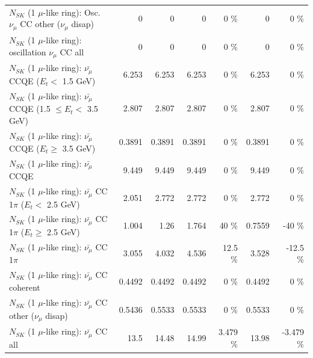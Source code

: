 \begin{table}
\begin{tabular}{| l | r | r | r  r | r  r |}
         $N_{SK}$ (1 $\mu$-like ring): Osc. $\nu_\mu$ CC other ($\nu_\mu$ disap) &               0 &               0 &               0 &        0 \%  &               0 &        0 \%  \\ 
                      $N_{SK}$ (1 $\mu$-like ring): oscillation $\nu_\mu$ CC all &               0 &               0 &               0 &        0 \%  &               0 &        0 \%  \\ 
\hline
\hline
          $N_{SK}$ (1 $\mu$-like ring): $\bar{\nu_\mu}$ CCQE ($E_{t} <$ 1.5 GeV) &           6.253 &           6.253 &           6.253 &        0 \%  &           6.253 &        0 \%  \\ 
 $N_{SK}$ (1 $\mu$-like ring): $\bar{\nu_\mu}$ CCQE (1.5 $\leq E_{t} <$ 3.5 GeV) &           2.807 &           2.807 &           2.807 &        0 \%  &           2.807 &        0 \%  \\ 
       $N_{SK}$ (1 $\mu$-like ring): $\bar{\nu_\mu}$ CCQE ($E_{t} \geq$ 3.5 GeV) &          0.3891 &          0.3891 &          0.3891 &        0 \%  &          0.3891 &        0 \%  \\ 
\hline
                              $N_{SK}$ (1 $\mu$-like ring): $\bar{\nu_\mu}$ CCQE &           9.449 &           9.449 &           9.449 &        0 \%  &           9.449 &        0 \%  \\ 
\hline
     $N_{SK}$ (1 $\mu$-like ring): $\bar{\nu_\mu}$ CC 1$\pi$ ($E_{t} <$ 2.5 GeV) &           2.051 &           2.772 &           2.772 &        0 \%  &           2.772 &        0 \%  \\ 
  $N_{SK}$ (1 $\mu$-like ring): $\bar{\nu_\mu}$ CC 1$\pi$ ($E_{t} \geq$ 2.5 GeV) &           1.004 &            1.26 &           1.764 &       40 \%  &          0.7559 &      -40 \%  \\ 
\hline
                         $N_{SK}$ (1 $\mu$-like ring): $\bar{\nu_\mu}$ CC 1$\pi$ &           3.055 &           4.032 &           4.536 &     12.5 \%  &           3.528 &    -12.5 \%  \\ 
                       $N_{SK}$ (1 $\mu$-like ring): $\bar{\nu_\mu}$ CC coherent &          0.4492 &          0.4492 &          0.4492 &        0 \%  &          0.4492 &        0 \%  \\ 
        $N_{SK}$ (1 $\mu$-like ring): $\bar{\nu_\mu}$ CC other ($\nu_\mu$ disap) &          0.5436 &          0.5533 &          0.5533 &        0 \%  &          0.5533 &        0 \%  \\ 
                          $N_{SK}$ (1 $\mu$-like ring): $\bar{\nu_{\mu}}$ CC all &            13.5 &           14.48 &           14.99 &    3.479 \%  &           13.98 &   -3.479 \%  \\ 

\end{tabular}
\end{table}
